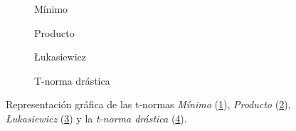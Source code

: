 \begin{figure}[H]
	\centering
	\begin{subfigure}[b]{0.45\textwidth}
		\setlength\figureheight{4.5cm}
		\setlength\figurewidth{6cm}
		
		\caption{Mínimo}
		\label{fig:t-norms-min}
	\end{subfigure}
	\qquad
	\begin{subfigure}[b]{0.45\textwidth}
		\setlength\figureheight{4.5cm}
		\setlength\figurewidth{6cm}
		
		\caption{Producto}
		\label{fig:t-norms-prod}
	\end{subfigure}
	
	\vspace{1 cm}
	\begin{subfigure}[b]{0.45\textwidth}
		\setlength\figureheight{4.5cm}
		\setlength\figurewidth{6cm}
		
		\caption{\L{}ukasiewicz}
		\label{fig:t-norms-lukasiewicz}
	\end{subfigure}
	\qquad
	\begin{subfigure}[b]{0.45\textwidth}
			\setlength\figureheight{4.5cm}
			\setlength\figurewidth{6cm}
			
			\caption{T-norma drástica}
			\label{fig:t-norms-drastic}
	\end{subfigure}
	\label{fig:t-norms}
	\caption{Representación gráfica de las t-normas \emph{Mínimo} (\ref{fig:t-norms-min}), \emph{Producto} (\ref{fig:t-norms-prod}), \emph{\L{}ukasiewicz} (\ref{fig:t-norms-lukasiewicz}) y la \emph{t-norma drástica} (\ref{fig:t-norms-drastic}).}
\end{figure}

